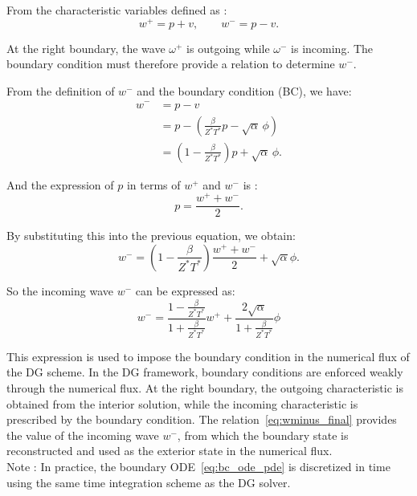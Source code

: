 \documentclass[11pt,a4paper]{report}
\theoremstyle{plain}
\theoremstyle{definition}
\begin{document}
From the characteristic variables defined as :
\begin{equation}
w^+ = p + v,
\qquad
w^- = p - v.
\end{equation}

At the right boundary, the wave $\omega^+$ is outgoing while $\omega^-$ is incoming.
The boundary condition must therefore provide a relation to determine $w^-$.

From the definition of $w^-$ and the boundary condition (BC), we have:
\begin{equation}
    \begin{aligned}
        w^-
        &= p - v \\
        &= p - \left( \frac{\beta}{Z^\ast T^\ast} p - \sqrt{\alpha}\,\phi \right) \\
        &= \left(1 - \frac{\beta}{Z^\ast T^\ast}\right)p + \sqrt{\alpha}\,\phi.
    \end{aligned}
\end{equation}

And the expression of $p$ in terms of $w^+$ and $w
^-$ is :
\begin{equation}
p = \frac{w^+ + w^-}{2}.
\end{equation}

By substituting this into the previous equation, we obtain:
\begin{equation}
w^-
= \left(1 - \frac{\beta}{Z^\ast T^\ast}\right)\frac{w^+ + w^-}{2} + \sqrt{\alpha} \phi.
\end{equation}

So the incoming wave $w^-$ can be expressed as:
\begin{equation}
\boxed{
w^- =
\frac{1 - \frac{\beta}{Z^\ast T^\ast}}{1 + \frac{\beta}{Z^\ast T^\ast}}
w^+
+
\frac{2\sqrt{\alpha}}{1 + \frac{\beta}{Z^\ast T^\ast}} \phi
}
\label{eq:wminus_final}
\end{equation}

This expression is used to impose the boundary condition in the numerical flux of the DG scheme.
In the DG framework, boundary conditions are enforced weakly through the numerical flux.
At the right boundary, the outgoing characteristic is obtained from the interior solution,
while the incoming characteristic is prescribed by the boundary condition.
The relation~\eqref{eq:wminus_final} provides the value of the incoming wave $w^-$, from which
the boundary state is reconstructed and used as the exterior state in the numerical flux.
\\
Note : In practice, the boundary ODE~\eqref{eq:bc_ode_pde} is discretized in time using the same time
integration scheme as the DG solver.
\end{document}
